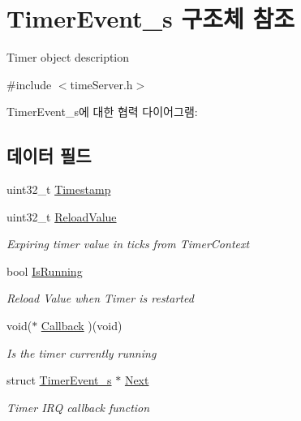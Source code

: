 \hypertarget{struct_timer_event__s}{}\section{Timer\+Event\+\_\+s 구조체 참조}
\label{struct_timer_event__s}


Timer object description  




{\ttfamily \#include $<$time\+Server.\+h$>$}



Timer\+Event\+\_\+s에 대한 협력 다이어그램\+:
\subsection*{데이터 필드}
\begin{DoxyCompactItemize}
\item 
uint32\+\_\+t \mbox{\hyperlink{struct_timer_event__s_ae6678057e9ed5db32d6d2db84671c146}{Timestamp}}
\item 
uint32\+\_\+t \mbox{\hyperlink{struct_timer_event__s_a670045cfad50e7e4b3a31c0119d6e4fd}{Reload\+Value}}
\begin{DoxyCompactList}\small\item\em Expiring timer value in ticks from Timer\+Context \end{DoxyCompactList}\item 
bool \mbox{\hyperlink{struct_timer_event__s_af5cb1246be24f89c7a5f720af0c92559}{Is\+Running}}
\begin{DoxyCompactList}\small\item\em Reload Value when Timer is restarted \end{DoxyCompactList}\item 
void($\ast$ \mbox{\hyperlink{struct_timer_event__s_ad008a5ba5a1c8dea486486fae73fd421}{Callback}} )(void)
\begin{DoxyCompactList}\small\item\em Is the timer currently running \end{DoxyCompactList}\item 
struct \mbox{\hyperlink{struct_timer_event__s}{Timer\+Event\+\_\+s}} $\ast$ \mbox{\hyperlink{struct_timer_event__s_ab4d4ae1079c4e3d4842a2cdf30ffad86}{Next}}
\begin{DoxyCompactList}\small\item\em Timer I\+RQ callback function \end{DoxyCompactList}\end{DoxyCompactItemize}


